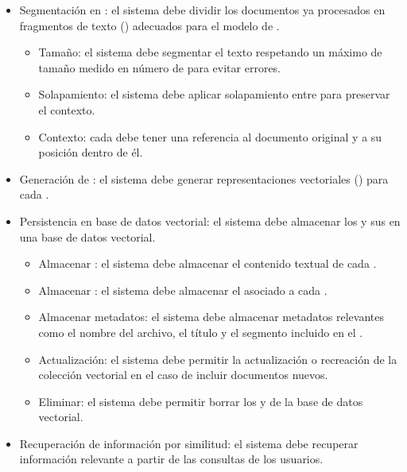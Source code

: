 \begin{itemize}
\begin{itemize}
\begin{itemize}
		\end{itemize}
	\end{itemize}
	\item {} Segmentación en : el sistema debe dividir los documentos ya procesados en fragmentos de texto () adecuados para el modelo de .
	\begin{itemize}
	\tightlist
		\item {} Tamaño: el sistema debe segmentar el texto respetando un máximo de tamaño medido en número de  para evitar errores.
		\item {} Solapamiento: el sistema debe aplicar solapamiento entre  para preservar el contexto.
		\item {} Contexto: cada  debe tener una referencia al documento original y a su posición dentro de él.
	\end{itemize}
	\item {} Generación de : el sistema debe generar representaciones vectoriales () para cada .
	\item {} Persistencia en base de datos vectorial: el sistema debe almacenar los  y sus  en una base de datos vectorial.
	\begin{itemize}
	\tightlist
		\item {} Almacenar : el sistema debe almacenar el contenido textual de cada .
		\item {} Almacenar : el sistema debe almacenar el  asociado a cada .
		\item {} Almacenar metadatos: el sistema debe almacenar metadatos relevantes como el nombre del archivo, el título y el segmento incluido en el .
		\item {} Actualización: el sistema debe permitir la actualización o recreación de la colección vectorial en el caso de incluir documentos nuevos.
		\item {} Eliminar: el sistema debe permitir borrar los  y  de la base de datos vectorial.
	\end{itemize}
	\item {} Recuperación de información por similitud: el sistema debe recuperar información relevante a partir de las consultas de los usuarios.
	\begin{itemize}

\end{itemize}
\end{itemize}
